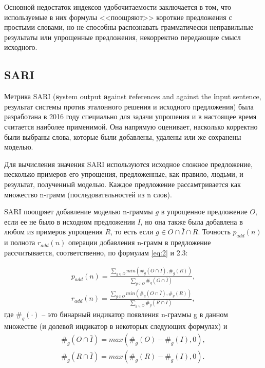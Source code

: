 Основной недостаток индексов удобочитаемости заключается в том, что используемые в них формулы <<поощряют>> короткие предложения с простыми словами, но не способны распознавать грамматически неправильные результаты или упрощенные предложения, некорректно передающие смысл исходного.

\subsection{SARI}

Метрика SARI (\textbf{s}ystem output \textbf{a}gainst \textbf{r}eferences and against the \textbf{i}nput sentence, результат системы против эталонного решения и исходного предложения) была разработана в 2016 году специально для задачи упрошения и в настоящее время считается наиболее применимой\cite{xu_optimizing_2016}. Она напрямую оценивает, насколько корректно были выбраны слова, которые были добавлены, удалены или же сохранены моделью.


Для вычисления значения SARI используются исходное сложное предложение, несколько примеров его упрощения, предложенные, как правило, людьми, и результат, полученный моделью. Каждое предложение рассамтривается как множество n-грамм (последовательностей из n слов).

SARI поощряет добавление моделью n-граммы $g$ в упрощенное предложение $O$, если ее не было в исходном предложении $I$, но она также была добавлена в любом из примеров упрощения $R$, то есть если $g \in{O\cap\bar{I}\cap{R}}$. Точность $p_{add}(n)$ и полнота $r_{add}(n)$ операции добавления n-грамм в предложение  рассчитывается, соответственно, по формулам \ref{eq:2} и 2.3: 

\begin{eqnarray} 
	\label{eq:2}
	p_{add}(n) = \frac{\sum\limits_{g\in{O}}^{} min\left( \#_{g}\left(O\cap{\bar{I}}\right), \#_{g}\left(R\right)\right)}{\sum\limits_{g\in{O}}^{} \#_{g}\left(O\cap{\bar{I}}\right)} ,\\
	r_{add}(n) = \frac{\sum\limits_{g\in{O}}^{} min\left( \#_{g}\left(O\cap{\bar{I}}\right), \#_{g}\left(R\right)\right)}{\sum\limits_{g\in{O}}^{} \#_{g}\left(R\cap{\bar{I}}\right)} ,
\end{eqnarray}
где $\#_{g}\left(\cdot\right)$ -- это бинарный индикатор появления n-граммы g в данном множестве (и долевой индикатор в некоторых следующих формулах) и 
\begin{eqnarray} 
	\label{eq:4}
	\#_{g}\left(O\cap{\bar{I}}\right) = max\left(\#_{g}\left(O\right) - \#_{g}\left(I\right), 0\right) ,\\
	\#_{g}\left(R\cap{\bar{I}}\right) = max\left(\#_{g}\left(R\right) - \#_{g}\left(I\right), 0\right) .
\end{eqnarray}

